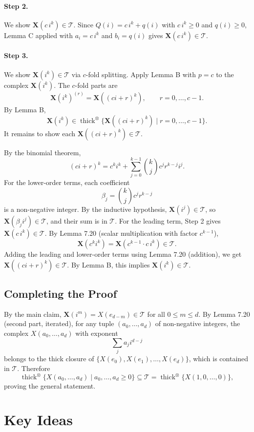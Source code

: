 \documentclass[11pt]{article}
\newcommand{\XX}{\mathbf{X}}
\newcommand{\TT}{\mathcal{T}}
\newcommand{\thicktensor}[1]{\operatorname{thick}^{\otimes}\{#1\}}
\begin{document}
\paragraph{Step 2.}
We show $\XX(c\,i^k)\in\TT$. Since $Q(i)=c\,i^k+q(i)$ with $c\,i^k\geqslant 0$ and $q(i)\geqslant 0$, Lemma C applied with $a_i=c\,i^k$ and $b_i=q(i)$ gives $\XX(c\,i^k)\in\TT$.

\paragraph{Step 3.}
We show $\XX(i^k)\in\TT$ via $c$-fold splitting. Apply Lemma B with $p=c$ to the complex $\XX(i^k)$. The $c$-fold parts are
\[
\XX(i^k)^{(r)}=\XX((ci+r)^k),
\qquad
r=0,\ldots,c-1.
\]
By Lemma B,
\[
\XX(i^k)\in\thicktensor{\XX((ci+r)^k)\mid r=0,\ldots,c-1}.
\]
It remains to show each $\XX((ci+r)^k)\in\TT$.

By the binomial theorem,
\[
(ci+r)^k=c^k i^k+\sum_{j=0}^{k-1}\binom{k}{j}c^j r^{k-j} i^j.
\]
For the lower-order terms, each coefficient
\[
\beta_j=\binom{k}{j}c^j r^{k-j}
\]
is a non-negative integer. By the inductive hypothesis, $\XX(i^j)\in\TT$, so $\XX(\beta_j i^j)\in\TT$, and their sum is in $\TT$. For the leading term, Step 2 gives $\XX(c\,i^k)\in\TT$. By Lemma 7.20 (scalar multiplication with factor $c^{k-1}$),
\[
\XX(c^k i^k)=\XX(c^{k-1}\cdot c\,i^k)\in\TT.
\]
Adding the leading and lower-order terms using Lemma 7.20 (addition), we get $\XX((ci+r)^k)\in\TT$. By Lemma B, this implies $\XX(i^k)\in\TT$.

\subsection*{Completing the Proof}

By the main claim, $\XX(i^m)=X(e_{d-m})\in\TT$ for all $0 \leqslant m \leqslant d$. By Lemma 7.20 (second part, iterated), for any tuple $(a_0,\ldots,a_d)$ of non-negative integers, the complex $X(a_0,\ldots,a_d)$ with exponent
\[
\sum_j a_j i^{d-j}
\]
belongs to the thick closure of $\{X(e_0),X(e_1),\ldots,X(e_d)\}$, which is contained in $\TT$. Therefore
\[
\thicktensor{X(a_0,\ldots,a_d)\mid a_0,\ldots,a_d \geqslant 0}
\subseteq
\TT
=
\thicktensor{X(1,0,\ldots,0)},
\]
proving the general statement.

\section*{Key Ideas}
\end{document}
